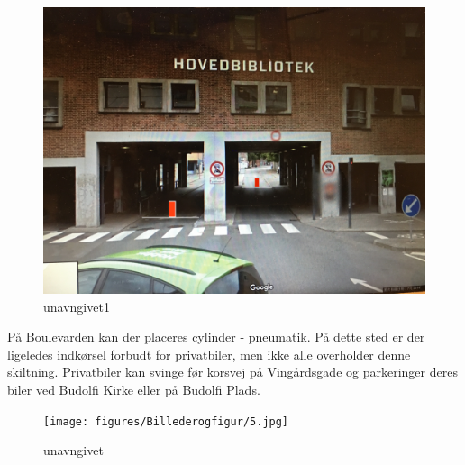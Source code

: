 \begin{figure}[htbp]
  \centering
  \begin{adjustbox}{max width=\textwidth}
    \includegraphics{figures/Billederogfigur/4.jpg}
 \end{adjustbox}
  \caption{unavngivet1}
   \label{fig:unavngivet1}
\end{figure}                                                
På Boulevarden kan der placeres cylinder - pneumatik. På dette sted er der ligeledes indkørsel forbudt for privatbiler, men ikke alle overholder denne skiltning. Privatbiler kan svinge før korsvej på Vingårdsgade og parkeringer deres biler ved Budolfi Kirke eller på Budolfi Plads. 

                                                                

\begin{figure}[htbp]
  \centering
  \begin{adjustbox}{max width=\textwidth}
    \texttt{[image: figures/Billederogfigur/5.jpg]}
 \end{adjustbox}
  \caption{unavngivet}
   \label{fig:unavngivet}
\end{figure}

